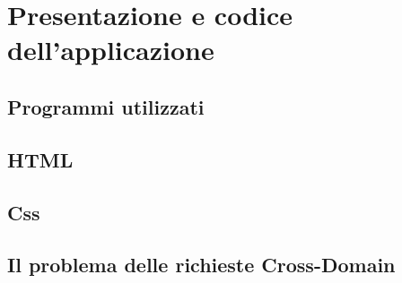 \documentclass[a4paper,11pt]{article}
\begin{document}
\section{Presentazione e codice dell'applicazione}
\label{sec:6}
\subsection{Programmi utilizzati}
\label{sec:6.1}
\subsection{HTML}
\label{sec:6.2}
\subsection{Css}
\label{sec:6.3}
\subsection{Il problema delle richieste Cross-Domain}
\label{sec:6.4}
\end{document}
